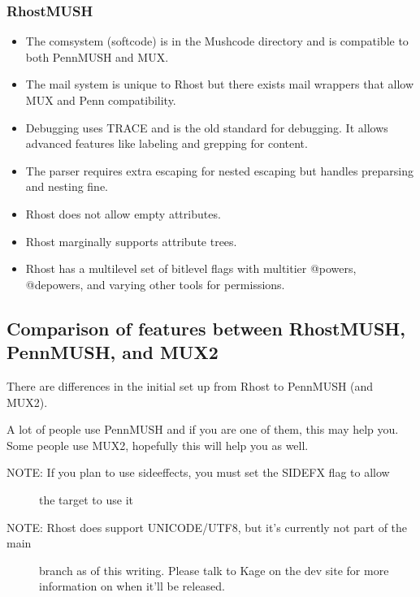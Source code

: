 \documentclass[letterpaper,10pt,english]{sphinxmanual}
\begin{document}
\subsubsection{RhostMUSH}
\label{\detokenize{differences:rhostmush}}\begin{itemize}
\item {} 
\sphinxAtStartPar
The comsystem (softcode) is in the Mushcode directory and is compatible to both PennMUSH and MUX.

\item {} 
\sphinxAtStartPar
The mail system is unique to Rhost but there exists mail wrappers that allow MUX and Penn compatibility.

\item {} 
\sphinxAtStartPar
Debugging uses TRACE and is the old standard for debugging.  It allows advanced features like labeling and grepping for content.

\item {} 
\sphinxAtStartPar
The parser requires extra escaping for nested escaping but handles pre\sphinxhyphen{}parsing and nesting fine.

\item {} 
\sphinxAtStartPar
Rhost does not allow empty attributes.

\item {} 
\sphinxAtStartPar
Rhost marginally supports attribute trees.

\item {} 
\sphinxAtStartPar
Rhost has a multi\sphinxhyphen{}level set of bitlevel flags with multi\sphinxhyphen{}tier @powers, @depowers, and varying other tools for permissions.

\end{itemize}


\subsection{Comparison of features between RhostMUSH, PennMUSH, and MUX2}
\label{\detokenize{differences:comparison-of-features-between-rhostmush-pennmush-and-mux2}}
\sphinxAtStartPar
There are differences in the initial set up from Rhost to PennMUSH (and MUX2).

\sphinxAtStartPar
A lot of people use PennMUSH and if you are one of them, this may help you.
Some people use MUX2, hopefully this will help you as well.
\begin{description}
\item[{NOTE:  If you plan to use sideeffects, you must set the SIDEFX flag to allow}] \leavevmode
\sphinxAtStartPar
the target to use it

\item[{NOTE:  Rhost does support UNICODE/UTF8, but it’s currently not part of the main}] \leavevmode
\sphinxAtStartPar
branch as of this writing.  Please talk to Kage on the dev site for more
information on when it’ll be released.

\end{description}
\end{document}
